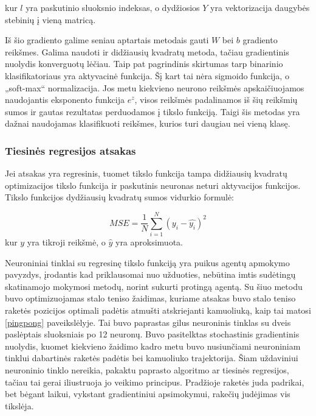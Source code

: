\documentclass[a4paper, 12pt]{article}
\begin{document}
kur $l$ yra paskutinio sluoksnio indeksas, o dydžiosios $Y$ yra vektorizacija daugybės stebinių į vieną matricą.

Iš šio gradiento galime seniau aptartais metodais gauti $W$ bei $b$ gradiento reikšmes. Galima naudoti ir didžiausių kvadratų metoda, tačiau gradientinis nuolydis konverguotų lėčiau.
Taip pat pagrindinis skirtumas tarp binarinio klasifikatoriaus yra aktyvacinė funkcija. Šį kart tai nėra sigmoido funkcija, o „soft-max“ normalizacija. Jos metu kiekvieno neurono reikšmės apskaičiuojamos naudojantis eksponento funkcija $e^z$, visos reikšmės padalinamos iš šių reikšmių sumos ir gautas rezultatas perduodamos į tikslo funkciją. Taigi šis metodas yra dažnai naudojamas klasifikuoti reikšmes, kurios turi daugiau nei vieną klasę.

%
\subsubsection{Tiesinės regresijos atsakas}
%

Jei atsakas yra regresinis, tuomet tikslo funkcija tampa didžiausių kvadratų optimizacijos tikslo funkcija ir paskutinis neuronas neturi aktyvacijos funkcijos. Tikslo funkcijos dydžiausių kvadratų sumos vidurkio formulė:

\begin{equation}
MSE=\frac{1}{N} \sum_{i=1}^{N}\left(y_i-\hat{y_i}\right)^{2}
\end{equation}
kur $y$ yra tikroji reikšmė, o $\hat{y}$ yra aproksimuota.

Neuroniniai tinklai su regresinę tikslo funkciją yra puikus agentų apmokymo pavyzdys, įrodantis kad priklausomai nuo užduoties, nebūtina imtis sudėtingų skatinamojo mokymosi metodų, norint sukurti protingą agentą. Su šiuo metodu buvo optimizuojamas stalo teniso žaidimas, kuriame atsakas buvo stalo teniso raketės pozicijos optimali padėtis atmušti atskriejanti kamuoliuką, kaip tai matosi \ref{pingpong} paveikslėlyje. Tai buvo paprastas gilus neuroninis tinklas su dveis paslėptais sluoksniais po 12 neuronų. Buvo pasitelktas stochastinis gradientinis nuolydis, kuomet kiekvieno žaidimo kadro metu buvo nusiunčiami neuroniniam tinklui dabartinės raketės padėtis bei kamuoliuko trajektorija. Šiam uždaviniui neuroninio tinklo nereikia, pakaktu paprasto algoritmo ar tiesinės regresijos, tačiau tai gerai iliustruoja jo veikimo principus. Pradžioje raketės juda padrikai, bet bėgant laikui, vykstant gradientiniui apsimokymui, rakečių judėjimas vis tikslėja.
\end{document}
